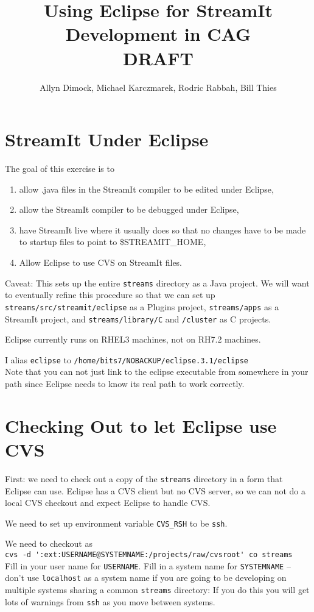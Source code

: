 \documentclass[11pt]{article}
\begin{document}
\title{Using Eclipse for StreamIt Development in CAG\\DRAFT}
\author{Allyn Dimock, Michael Karczmarek, Rodric Rabbah, Bill Thies}
\maketitle

\section{StreamIt Under Eclipse}
The goal of this exercise is to 
\begin{enumerate}
\item allow .java files in the StreamIt compiler to be edited under
  Eclipse,
\item allow the StreamIt compiler to be debugged under Eclipse,
\item have StreamIt live where it usually 
does so that no changes have to be made to startup files to point to
\$STREAMIT\_HOME,
\item Allow Eclipse to use CVS on StreamIt files.
\end{enumerate}
Caveat: This sets up the entire {\tt streams} directory as a Java project.
We will want to eventually refine this procedure so that we can set up
{\tt streams/src/streamit/eclipse} as a Plugins project, {\tt streams/apps} as a
StreamIt project, and {\tt streams/library/C} and {\tt /cluster} as C projects.

Eclipse currently runs on RHEL3 machines, not on RH7.2 machines.

I alias {\tt eclipse} to {\tt /home/bits7/NOBACKUP/eclipse.3.1/eclipse}\\
Note that you can not just link to the eclipse executable from
somewhere in your path since Eclipse needs to know its real path to
work correctly.

\section{Checking Out to let Eclipse use CVS}
\label{secCheckout}

First: we need to check out a copy of the {\tt streams} directory in a
form that Eclipse can use.
Eclipse has a CVS client but no CVS server, so we can not do a local
CVS checkout and expect Eclipse to handle CVS.

We need to set up environment variable {\tt CVS\_RSH} to be {\tt ssh}.

We need to checkout as\\
\verb+cvs -d ':ext:USERNAME@SYSTEMNAME:/projects/raw/cvsroot' co streams+\\
Fill in your user name for {\tt USERNAME}.  
Fill in a system name for {\tt SYSTEMNAME} -- don't use {\tt  localhost}
as a system name if you are going to be developing on multiple systems
sharing a common {\tt streams} directory: If you do this you will get lots
of warnings from {\tt ssh} as you move between systems.
\end{document}
